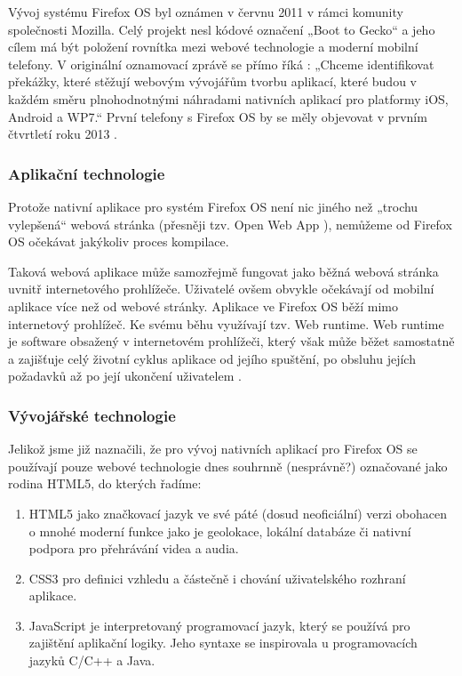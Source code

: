 Vývoj systému Firefox OS byl oznámen v červnu 2011 v rámci komunity společnosti Mozilla. Celý projekt nesl kódové označení „Boot to Gecko“ a jeho cílem má být položení rovnítka mezi webové technologie a moderní mobilní telefony. V originální oznamovací zprávě se přímo říká \cite{booting_to_the_web}: „Chceme identifikovat překážky, které stěžují webovým vývojářům tvorbu aplikací, které budou v každém směru plnohodnotnými náhradami nativních aplikací pro platformy iOS, Android a WP7.“ První telefony s Firefox OS by se měly objevovat v prvním čtvrtletí roku 2013 \cite{ztes_first_firefoxos}.

\subsubsection{Aplikační technologie}
Protože nativní aplikace pro systém Firefox OS není nic jiného než „trochu vylepšená“ webová stránka (přesněji tzv. Open Web App \cite{faqs_mozilla}), nemůžeme od Firefox OS očekávat jakýkoliv proces kompilace.

Taková webová aplikace může samozřejmě fungovat jako běžná webová stránka uvnitř internetového prohlížeče. Uživatelé ovšem obvykle očekávají od mobilní aplikace více než od webové stránky. Aplikace ve Firefox OS běží mimo internetový prohlížeč. Ke svému běhu využívají tzv. Web runtime. Web runtime je software obsažený v internetovém prohlížeči, který však může běžet samostatně a zajišťuje celý životní cyklus aplikace od jejího spuštění, po obsluhu jejích požadavků až po její ukončení uživatelem \cite{apps_architecture}.

\subsubsection{Vývojářské technologie}
Jelikož jsme již naznačili, že pro vývoj nativních aplikací pro Firefox OS se používají pouze webové technologie dnes souhrnně (nesprávně?) označované jako rodina HTML5, do kterých řadíme:

\begin{enumerate}
	\item HTML5 jako značkovací jazyk ve své páté (dosud neoficiální) verzi obohacen o mnohé moderní funkce jako je geolokace, lokální databáze či nativní podpora pro přehrávání videa a audia.
	\item CSS3 pro definici vzhledu a částečně i chování uživatelského rozhraní aplikace.
	\item JavaScript je interpretovaný programovací jazyk, který se používá pro zajištění aplikační logiky. Jeho syntaxe se inspirovala u programovacích jazyků C/C++ a Java.
\end{enumerate}


